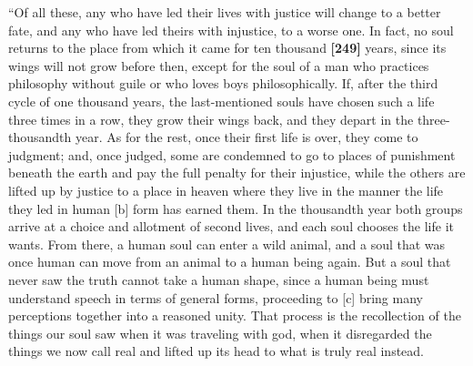 “Of all these, any who have led their lives with justice will change to
a better fate, and any who have led theirs with injustice, to a worse
one. In fact, no soul returns to the place from which it came for ten
thousand {\bf {[}249{]}} years, since its wings will not grow before
then, except for the soul of a man who practices philosophy without
guile or who loves boys philosophically. If, after the third cycle of
one thousand years, the last-mentioned souls have chosen such a life
three times in a row, they grow their wings back, and they depart in the
three-thousandth year. As for the rest, once their first life is over,
they come to judgment; and, once judged, some are condemned to go to
places of punishment beneath the earth and pay the full penalty for
their injustice, while the others are lifted up by justice to a place in
heaven where they live in the manner the life they led in human {[}b{]}
form has earned them. In the thousandth year both groups arrive at a
choice and allotment of second lives, and each soul chooses the life it
wants. From there, a human soul can enter a wild animal, and a soul that
was once human can move from an animal to a human being again. But a
soul that never saw the truth cannot take a human shape, since a human
being must understand speech in terms of general forms, proceeding to
{[}c{]} bring many perceptions together into a reasoned
unity. That process is
the recollection of the things our soul saw when it was traveling with
god, when it disregarded the things we now call real and lifted up its
head to what is truly real instead.

